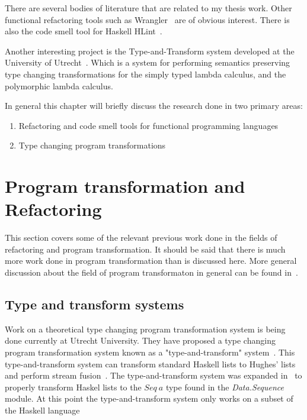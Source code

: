 There are several bodies of literature that are related to my thesis work. Other functional refactoring tools such as Wrangler~\citep{wrangler} are of obvious interest. There is also the code smell tool for Haskell HLint~\citep{hlint}.

Another interesting project is the Type-and-Transform system developed at the University of Utrecht~\citep{typeAndTransform}. Which is a system for performing semantics preserving type changing transformations for the simply typed lambda calculus, and the polymorphic lambda calculus.

In general this chapter will briefly discuss the research done in two primary areas:

\begin{enumerate}
\item Refactoring and code smell tools for functional programming languages
\item Type changing program transformations 
\end{enumerate}

\section{Program transformation and Refactoring}

This section covers some of the relevant previous work done in the fields of refactoring and program transformation. It should be said that there is much more work done in program transformation than is discussed here. More general discussion about the field of program transformaton in general can be found in~\citep{visserSurvey,transformationIntro}.

\subsection{Type and transform systems}

Work on a theoretical type changing program transformation system is being done currently at Utrecht University. They have proposed a type changing program transformation system known as a "type-and-transform" system~\citep{typeAndTransform}. This type-and-transform system can transform standard Haskell lists to Hughes' lists and perform stream fusion~\citep{typeAndTransform}. The type-and-transform system was expanded in~\citep{typeAndTransformPatterns} to properly transform Haskel lists to the $Seq~a$ type found in the \textit{Data.Sequence} module. At this point the type-and-transform system only works on a subset of the Haskell language~\citep{typeAndTransform}

